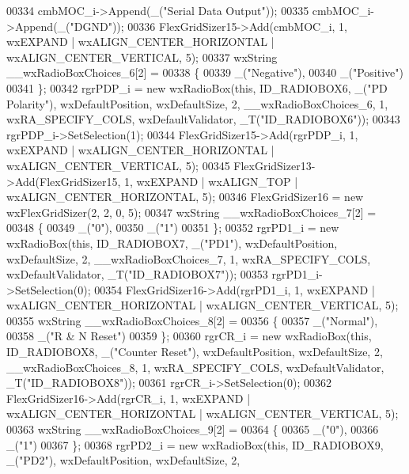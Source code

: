 \begin{DoxyCode}
00334     cmbMOC\_i->Append(\_(\textcolor{stringliteral}{"Serial Data Output"}));
00335     cmbMOC\_i->Append(\_(\textcolor{stringliteral}{"DGND"}));
00336     FlexGridSizer15->Add(cmbMOC\_i, 1, wxEXPAND | wxALIGN\_CENTER\_HORIZONTAL | wxALIGN\_CENTER\_VERTICAL, 5);
00337     wxString \_\_wxRadioBoxChoices\_6[2] =
00338     \{
00339         \_(\textcolor{stringliteral}{"Negative"}),
00340         \_(\textcolor{stringliteral}{"Positive"})
00341     \};
00342     rgrPDP\_i = \textcolor{keyword}{new} wxRadioBox(\textcolor{keyword}{this}, ID\_RADIOBOX6, \_(\textcolor{stringliteral}{"PD Polarity"}), wxDefaultPosition, wxDefaultSize, 2, 
      \_\_wxRadioBoxChoices\_6, 1, wxRA\_SPECIFY\_COLS, wxDefaultValidator, \_T(\textcolor{stringliteral}{"ID\_RADIOBOX6"}));
00343     rgrPDP\_i->SetSelection(1);
00344     FlexGridSizer15->Add(rgrPDP\_i, 1, wxEXPAND | wxALIGN\_CENTER\_HORIZONTAL | wxALIGN\_CENTER\_VERTICAL, 5);
00345     FlexGridSizer13->Add(FlexGridSizer15, 1, wxEXPAND | wxALIGN\_TOP | wxALIGN\_CENTER\_HORIZONTAL, 5);
00346     FlexGridSizer16 = \textcolor{keyword}{new} wxFlexGridSizer(2, 2, 0, 5);
00347     wxString \_\_wxRadioBoxChoices\_7[2] =
00348     \{
00349         \_(\textcolor{stringliteral}{"0"}),
00350         \_(\textcolor{stringliteral}{"1"})
00351     \};
00352     rgrPD1\_i = \textcolor{keyword}{new} wxRadioBox(\textcolor{keyword}{this}, ID\_RADIOBOX7, \_(\textcolor{stringliteral}{"PD1"}), wxDefaultPosition, wxDefaultSize, 2, 
      \_\_wxRadioBoxChoices\_7, 1, wxRA\_SPECIFY\_COLS, wxDefaultValidator, \_T(\textcolor{stringliteral}{"ID\_RADIOBOX7"}));
00353     rgrPD1\_i->SetSelection(0);
00354     FlexGridSizer16->Add(rgrPD1\_i, 1, wxEXPAND | wxALIGN\_CENTER\_HORIZONTAL | wxALIGN\_CENTER\_VERTICAL, 5);
00355     wxString \_\_wxRadioBoxChoices\_8[2] =
00356     \{
00357         \_(\textcolor{stringliteral}{"Normal"}),
00358         \_(\textcolor{stringliteral}{"R & N Reset"})
00359     \};
00360     rgrCR\_i = \textcolor{keyword}{new} wxRadioBox(\textcolor{keyword}{this}, ID\_RADIOBOX8, \_(\textcolor{stringliteral}{"Counter Reset"}), wxDefaultPosition, wxDefaultSize, 2, 
      \_\_wxRadioBoxChoices\_8, 1, wxRA\_SPECIFY\_COLS, wxDefaultValidator, \_T(\textcolor{stringliteral}{"ID\_RADIOBOX8"}));
00361     rgrCR\_i->SetSelection(0);
00362     FlexGridSizer16->Add(rgrCR\_i, 1, wxEXPAND | wxALIGN\_CENTER\_HORIZONTAL | wxALIGN\_CENTER\_VERTICAL, 5);
00363     wxString \_\_wxRadioBoxChoices\_9[2] =
00364     \{
00365         \_(\textcolor{stringliteral}{"0"}),
00366         \_(\textcolor{stringliteral}{"1"})
00367     \};
00368     rgrPD2\_i = \textcolor{keyword}{new} wxRadioBox(\textcolor{keyword}{this}, ID\_RADIOBOX9, \_(\textcolor{stringliteral}{"PD2"}), wxDefaultPosition, wxDefaultSize, 2, 

\end{DoxyCode}
